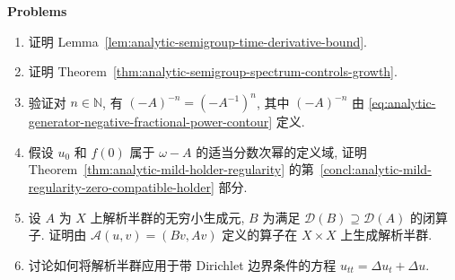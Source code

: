 \textbf{Problems}

\begin{enumerate}[label=\thesection.\arabic*.,ref=\thesection.\arabic*,start=20,series=book-problems]

\item\label{ex:analytic-semigroup-derivative-bound-proof} 证明 Lemma~\ref{lem:analytic-semigroup-time-derivative-bound}.

\item\label{ex:analytic-semigroup-spectral-growth-proof} 证明 Theorem~\ref{thm:analytic-semigroup-spectrum-controls-growth}.

\item\label{ex:fractional-power-integer-inverse-identity} 验证对 $n\in\mathbb{N}$, 有 $(-A)^{-n}=(-A^{-1})^n$, 其中 $(-A)^{-n}$ 由 \eqref{eq:analytic-generator-negative-fractional-power-contour} 定义.

\item\label{ex:analytic-mild-fractional-compatible-initial-regularity} 假设 $u_0$ 和 $f(0)$ 属于 $\omega-A$ 的适当分数次幂的定义域, 证明 Theorem~\ref{thm:analytic-mild-holder-regularity} 的第~\ref{concl:analytic-mild-regularity-zero-compatible-holder} 部分.

\item\label{ex:analytic-semigroup-off-diagonal-product-space-generator} 设 $A$ 为 $X$ 上解析半群的无穷小生成元, $B$ 为满足 $\mathcal{D}(B)\supseteq\mathcal{D}(A)$ 的闭算子. 证明由 $\mathcal{A}(u,v)=(Bv,Av)$ 定义的算子在 $X\times X$ 上生成解析半群.

\item\label{ex:analytic-semigroup-strongly-damped-wave-equation} 讨论如何将解析半群应用于带 Dirichlet 边界条件的方程 $u_{tt}=\Delta u_t+\Delta u$.

\end{enumerate}
